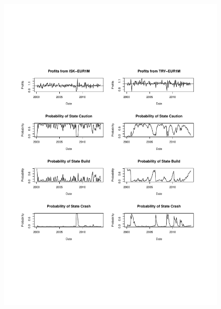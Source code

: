 \documentclass[12pt, a4paper, oneside]{article} %
\begin{document}
\begin{figure}[h!]
\centering
\includegraphics[scale = .80]{../Figures/3RegProb/ISKTRYEUR.pdf}
\end{figure}
\end{document}
